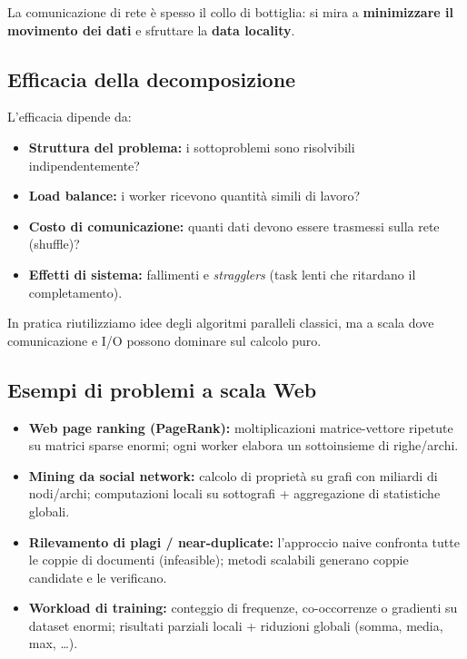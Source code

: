 \vspace{0.5em}
\begin{importante}
  La comunicazione di rete è spesso il collo di bottiglia: si mira a
  \textbf{minimizzare il movimento dei dati} e sfruttare la \textbf{data locality}.
\end{importante}

\subsection{Efficacia della decomposizione}

L'efficacia dipende da:
\begin{itemize}
  \item \textbf{Struttura del problema:} i sottoproblemi sono risolvibili
    indipendentemente?
  \item \textbf{Load balance:} i worker ricevono quantità simili di lavoro?
  \item \textbf{Costo di comunicazione:} quanti dati devono essere trasmessi
    sulla rete (shuffle)?
  \item \textbf{Effetti di sistema:} fallimenti e \emph{stragglers} (task lenti
    che ritardano il completamento).
\end{itemize}

In pratica riutilizziamo idee degli algoritmi paralleli classici, ma a scala
dove comunicazione e I/O possono dominare sul calcolo puro.

\subsection{Esempi di problemi a scala Web}

\begin{itemize}
  \item \textbf{Web page ranking (PageRank):} moltiplicazioni matrice-vettore
    ripetute su matrici sparse enormi; ogni worker elabora un sottoinsieme
    di righe/archi.
  \item \textbf{Mining da social network:} calcolo di proprietà su grafi con
    miliardi di nodi/archi; computazioni locali su sottografi + aggregazione
    di statistiche globali.
  \item \textbf{Rilevamento di plagi / near-duplicate:} l'approccio naive
    confronta tutte le coppie di documenti (infeasible); metodi scalabili
    generano coppie candidate e le verificano.
  \item \textbf{Workload di training:} conteggio di frequenze, co-occorrenze
    o gradienti su dataset enormi; risultati parziali locali + riduzioni globali
    (somma, media, max, \ldots).
\end{itemize}


